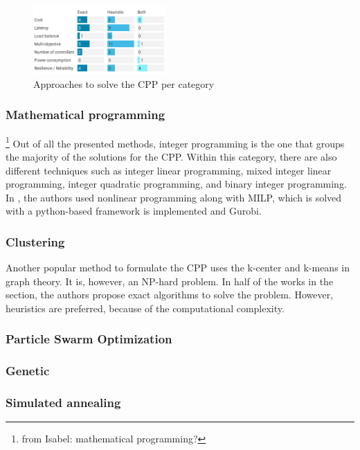 \documentclass{IEEEtran}
\newcommand\fia[1]{{\color{red}\footnote{\color{red}from Isabel: #1}}} %
\newcommand\delia[1]{{\tiny{\color{red}#1}}} %
\begin{document}
\begin{figure}
    \centering
    \includegraphics[width=0.45\textwidth]{Pictures/category_method.png}
    \caption{Approaches to solve the CPP per category}
    \label{fig:approach_cat}
\end{figure}



 

\subsubsection{Mathematical programming} \fia{mathematical programming?} Out of all the presented methods, integer programming is the one that groups the majority of the solutions for the CPP. Within this category, there are also different techniques such as integer linear programming, mixed integer linear programming, integer quadratic programming, and binary integer programming. In \cite{HeBa17}, the authors used nonlinear programming along with MILP, which is solved with a python-based framework \delia{is implemented} and Gurobi.


\subsubsection{Clustering} Another popular method to formulate the CPP uses the k-center and k-means in graph theory. It is, however, an NP-hard problem. In half of the works in the section, the authors propose exact algorithms to solve the problem. However, heuristics are preferred, because of the computational complexity.


\subsubsection{Particle Swarm Optimization}

\subsubsection{Genetic}

\subsubsection{Simulated annealing}
\end{document}

